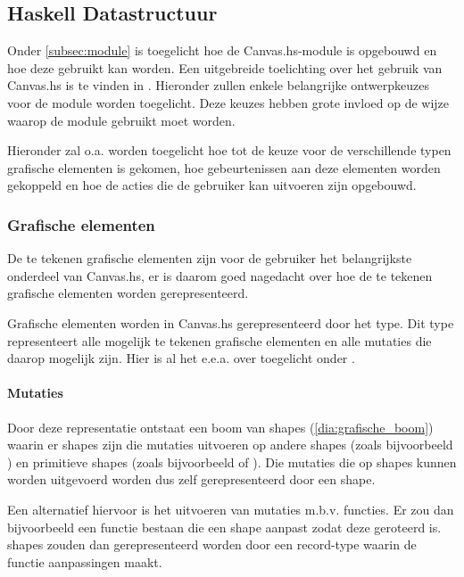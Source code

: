 \subsection{Haskell Datastructuur} \label{subsec:grafische_bibliotheek}
Onder \autoref{subsec:module} is toegelicht hoe de Canvas.hs-module is opgebouwd en hoe deze gebruikt kan worden. Een uitgebreide toelichting over het gebruik van Canvas.hs is te vinden in . Hieronder zullen enkele belangrijke ontwerpkeuzes voor de module worden toegelicht. Deze keuzes hebben grote invloed op de wijze waarop de module gebruikt moet worden. 

Hieronder zal o.a. worden toegelicht hoe tot de keuze voor de verschillende typen grafische elementen is gekomen, hoe gebeurtenissen aan deze elementen worden gekoppeld en hoe de acties die de gebruiker kan uitvoeren zijn opgebouwd.

\subsubsection{Grafische elementen}
De te tekenen grafische elementen zijn voor de gebruiker het belangrijkste onderdeel van Canvas.hs, er is daarom goed nagedacht over hoe de te tekenen grafische elementen worden gerepresenteerd. 

Grafische elementen worden in Canvas.hs gerepresenteerd door het type. Dit type representeert alle mogelijk te tekenen grafische elementen en alle mutaties die daarop mogelijk zijn. Hier is al het e.e.a. over toegelicht onder .

\paragraph{Mutaties}
Door deze representatie ontstaat een boom van shapes (\autoref{dia:grafische_boom}) waarin er shapes zijn die mutaties uitvoeren op andere shapes (zoals bijvoorbeeld ) en primitieve shapes (zoals bijvoorbeeld  of ). Die mutaties die op shapes kunnen worden uitgevoerd worden dus zelf gerepresenteerd door een shape.

Een alternatief hiervoor is het uitvoeren van mutaties m.b.v. functies. Er zou dan bijvoorbeeld een functie  bestaan die een shape aanpast zodat deze geroteerd is. shapes zouden dan gerepresenteerd worden door een record-type waarin de functie aanpassingen maakt. 

